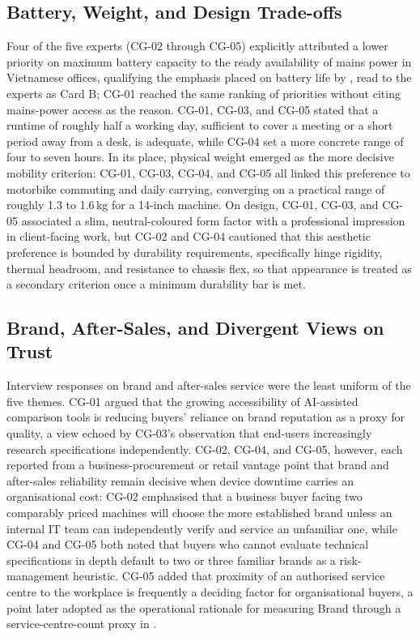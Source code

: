 \subsection{Battery, Weight, and Design Trade-offs}

Four of the five experts (CG-02 through CG-05) explicitly attributed a lower priority on
maximum battery capacity to the ready availability of mains power in Vietnamese offices,
qualifying the emphasis placed on battery life by \textcite{weng_siew_lam_evaluation_2023},
read to the experts as Card B; CG-01 reached the same ranking of priorities without citing
mains-power access as the reason. CG-01,
CG-03, and CG-05 stated that a runtime of roughly half a working day, sufficient to cover a
meeting or a short period away from a desk, is adequate, while CG-04 set a more concrete
range of four to seven hours. In its place, physical weight emerged as the more decisive
mobility criterion: CG-01, CG-03, CG-04, and CG-05 all linked this preference to motorbike
commuting and daily carrying, converging on a practical range of roughly 1.3 to 1.6\,kg for
a 14-inch machine. On design, CG-01, CG-03, and CG-05 associated a slim, neutral-coloured
form factor with a professional impression in client-facing work, but CG-02 and CG-04
cautioned that this aesthetic preference is bounded by durability requirements, specifically
hinge rigidity, thermal headroom, and resistance to chassis flex, so that appearance is
treated as a secondary criterion once a minimum durability bar is met.

\subsection{Brand, After-Sales, and Divergent Views on Trust}

Interview responses on brand and after-sales service were the least uniform of the five
themes. CG-01 argued that the growing accessibility of AI-assisted comparison tools is
reducing buyers' reliance on brand reputation as a proxy for quality, a view echoed by
CG-03's observation that end-users increasingly research specifications independently.
CG-02, CG-04, and CG-05, however, each reported from a business-procurement or retail
vantage point that brand and after-sales reliability remain decisive when device downtime
carries an organisational cost: CG-02 emphasised that a business buyer facing two
comparably priced machines will choose the more established brand unless an internal IT
team can independently verify and service an unfamiliar one, while CG-04 and CG-05 both
noted that buyers who cannot evaluate technical specifications in depth default to two or
three familiar brands as a risk-management heuristic. CG-05 added that proximity of an
authorised service centre to the workplace is frequently a deciding factor for
organisational buyers, a point later adopted as the operational rationale for measuring
Brand through a service-centre-count proxy in .

